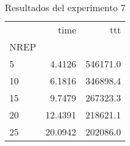 \begin{table}
\centering
\caption{Resultados del experimento 7}
\label{tab:ex7}
\begin{tabular}{lrr}
\toprule
{} &     time &       ttt \\
NREP &          &           \\
\midrule
5    &   4.4126 &  546171.0 \\
10   &   6.1816 &  346898.4 \\
15   &   9.7479 &  267323.3 \\
20   &  12.4391 &  218621.1 \\
25   &  20.0942 &  202086.0 \\
\bottomrule
\end{tabular}
\end{table}
